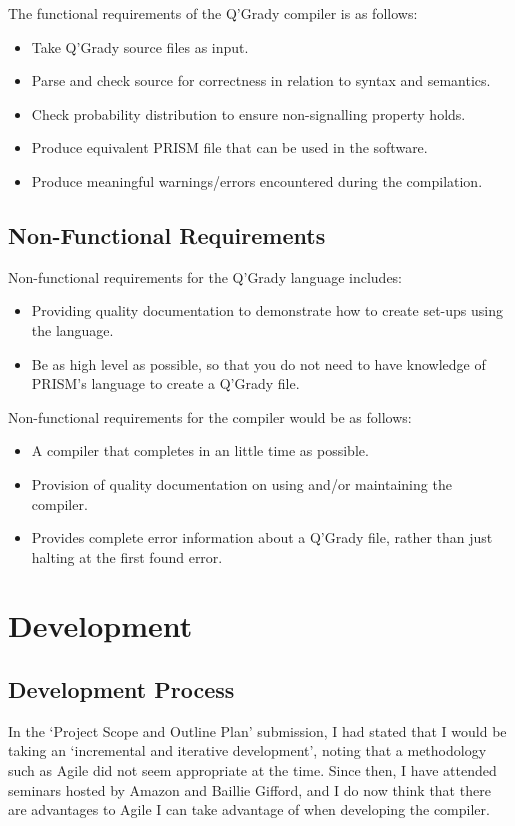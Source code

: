 \documentclass[11pt, a4paper]{article}
\begin{document}
The functional requirements of the Q'Grady compiler is as follows:
\begin{itemize}
    \item Take Q'Grady source files as input.
    \item Parse and check source for correctness in relation to syntax and
    semantics.
    \item Check probability distribution to ensure non-signalling property
    holds.
    \item Produce equivalent PRISM file that can be used in the software.
    \item Produce meaningful warnings/errors encountered during the
    compilation.
\end{itemize}

\subsection{Non-Functional Requirements} %
\label{sub:non_functional_requirements}
Non-functional requirements for the Q'Grady language includes:
\begin{itemize}
    \item Providing quality documentation to demonstrate how to create set-ups
    using the language.
    \item Be as high level as possible, so that you do not need to
    have knowledge of PRISM's language to create a Q'Grady file.
\end{itemize}
Non-functional requirements for the compiler would be as follows:
\begin{itemize}
    \item A compiler that completes in an little time as possible.
    \item Provision of quality documentation on using and/or maintaining the
    compiler.
    \item Provides complete error information about a Q'Grady file, rather than
    just halting at the first found error.
\end{itemize}


\section{Development} %
\label{sec:development}
\subsection{Development Process} %
\label{sub:development_process}
In the `Project Scope and Outline Plan' submission, I had stated that I would
be taking an `incremental and iterative development', noting that a methodology
such as Agile did not seem appropriate at the time. Since then, I have attended
seminars hosted by Amazon and Baillie Gifford, and I do now think that there
are advantages to Agile I can take advantage of when developing the compiler.
\end{document}

